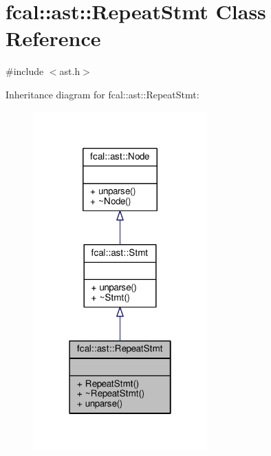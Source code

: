 \hypertarget{classfcal_1_1ast_1_1RepeatStmt}{}\section{fcal\+:\+:ast\+:\+:Repeat\+Stmt Class Reference}
\label{classfcal_1_1ast_1_1RepeatStmt}


{\ttfamily \#include $<$ast.\+h$>$}



Inheritance diagram for fcal\+:\+:ast\+:\+:Repeat\+Stmt\+:
\nopagebreak
\begin{figure}[H]
\begin{center}
\leavevmode
\includegraphics[width=190pt]{classfcal_1_1ast_1_1RepeatStmt__inherit__graph}
\end{center}
\end{figure}



